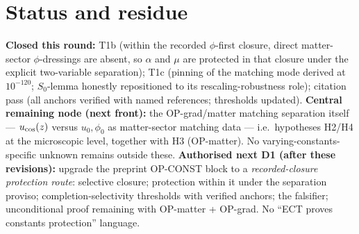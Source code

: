 \documentclass[11pt,a4paper]{article}
\begin{document}
\section{Status and residue}
\textbf{Closed this round:} T1b (within the recorded $\phi$-first closure,
direct matter-sector $\phi$-dressings are absent, so $\alpha$ and $\mu$ are
protected in that closure under the explicit two-variable separation); T1c
(pinning of the matching mode derived at $10^{-120}$; $S_0$-lemma honestly
repositioned to its rescaling-robustness role); citation pass (all anchors
verified with named references; thresholds updated). \textbf{Central remaining
node (next front):} the OP-grad/matter matching separation itself ---
$u_{\rm cos}(z)$ versus $u_0,\phi_0$ as matter-sector matching data --- i.e.\
hypotheses H2/H4 at the microscopic level, together with H3 (OP-matter). No
varying-constants-specific unknown remains outside these.
\textbf{Authorised next D1 (after these revisions):} upgrade the preprint
OP-CONST block to a \emph{recorded-closure protection route}: selective closure;
protection within it under the separation proviso; completion-selectivity
thresholds with verified anchors; the falsifier; unconditional proof remaining
with OP-matter + OP-grad. No ``ECT proves constants protection'' language.
\end{document}
